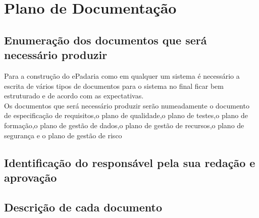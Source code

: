 \chapter{Plano de Documentação}
\label{plano_de_documentacao}

\section{Enumeração dos documentos que será necessário produzir}
Para a construção do ePadaria como em qualquer um sistema é necessário a escrita de vários tipos de documentos para o sistema no final ficar bem estruturado e de acordo com as expectativas.\\
Os documentos que será necessário produzir serão numeadamente o documento de especificação de requisitos,o plano de qualidade,o plano de testes,o plano de formação,o plano de gestão de dados,o plano de gestão de recursos,o plano de segurança e o plano de gestão de risco
\section{Identificação do responsável pela sua redação e aprovação}

\section{Descrição de cada documento}